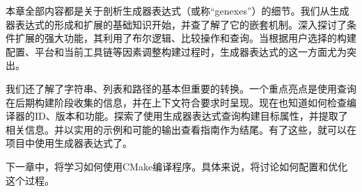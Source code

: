 

本章全部内容都是关于剖析生成器表达式（或称“genexes”）的细节。我们从生成器表达式的形成和扩展的基础知识开始，并查了解了它的嵌套机制。深入探讨了条件扩展的强大功能，其利用了布尔逻辑、比较操作和查询。当根据用户选择的构建配置、平台和当前工具链等因素调整构建过程时，生成器表达式的这一方面尤为突出。

我们还了解了字符串、列表和路径的基本但重要的转换。一个重点亮点是使用查询在后期构建阶段收集的信息，并在上下文符合要求时呈现。现在也知道如何检查编译器的ID、版本和功能。探索了使用生成器表达式查询构建目标属性，并提取了相关信息。并以实用的示例和可能的输出查看指南作为结尾。有了这些，就可以在项目中使用生成器表达式了。

下一章中，将学习如何使用CMake编译程序。具体来说，将讨论如何配置和优化这个过程。
